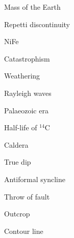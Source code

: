 \documentclass[11pt,a4paper]{article}
\begin{document}
\begin{parts}
  \item Mass of the Earth
  \item Repetti discontinuity
  \item NiFe
  \item Catastrophism
  \item Weathering
  \item Rayleigh waves
  \item Palaeozoic era
  \item Half-life of $^{14} \text{C}$
  \item Caldera
  \item True dip
  \item Antiformal syncline
  \item Throw of fault
  \item Outcrop
  \item Contour line
\end{parts}
\end{document}
